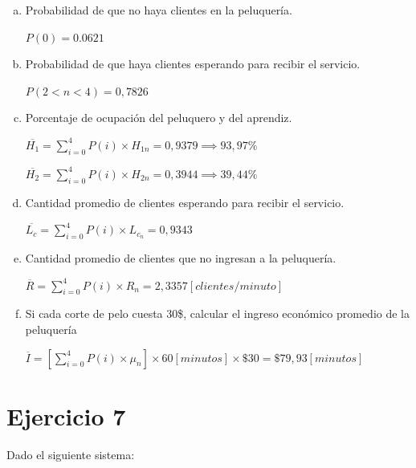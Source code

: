 \documentclass[a4paper,11pt]{article}
\begin{document}
\vspace{27pt}
\begin{enumerate}[a)]
  \item Probabilidad de que no haya clientes en la peluquería.

  $P(0) = 0.0621$

  \vspace{13pt}
  \item Probabilidad de que haya clientes esperando para recibir el servicio.

  $P(2<n<4) = 0,7826$

  \vspace{13pt}
  \item Porcentaje de ocupación del peluquero y del aprendiz.

  $\overline{H_1} = \displaystyle\sum_{i=0}^{4} P(i) \times H_{1n} = 0,9379 \implies 93,97\% $

  $\overline{H_2} = \displaystyle\sum_{i=0}^{4} P(i) \times H_{2n} = 0,3944 \implies 39,44\% $

  \vspace{13pt}
  \parindent=0pt
  \item Cantidad promedio de clientes esperando para recibir el servicio.

  $\overline{L_c} = \displaystyle\sum_{i=0}^{4} P(i) \times L_{c_n} = 0,9343$

  \vspace{13pt}
  \item Cantidad promedio de clientes que no ingresan a la peluquería.

  $\overline{R} = \displaystyle\sum_{i=0}^{4} P(i) \times R_n = 2,3357[clientes/minuto]$

  \vspace{13pt}
  \item Si cada corte de pelo cuesta 30\$, calcular el ingreso económico promedio
    de la peluquería

  $\overline{I} = \left[ \displaystyle\sum_{i=0}^{4} P(i) \times \mu_n \right] \times 60[minutos] \times \$30 = \$79,93[minutos]$

\end{enumerate}

\vspace{35pt}
\leftskip=0pt
\parindent=0pt
\section{\textbf{Ejercicio 7}}

Dado el siguiente sistema:
\end{document}
